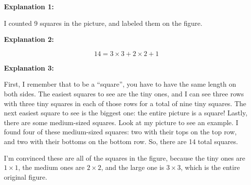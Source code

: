 \documentclass[noauthor,nooutcomes]{ximera}
\begin{document}
\parbox{2.5in}{
\begin{mdframed}

{\bf Explanation 1:}
\begin{center}
\end{center}

I counted 9 squares in the picture, and labeled them on the figure.

\end{mdframed}}
\parbox{2in}{
\begin{mdframed}
{\bf Explanation 2:}

$$ 14 = 3\times 3 + 2\times 2 + 1 $$


\end{mdframed}}

\begin{mdframed}
{\bf Explanation 3:}

First, I remember that to be a ``square'', you have to have the same length on both sides.  The easiest squares to see are the tiny ones, and I can see three rows with three tiny squares in each of those rows for a total of nine tiny squares.  The next easiest square to see is the biggest one: the entire picture is a square!  Lastly, there are some medium-sized squares.  Look at my picture to see an example.  I found four of these medium-sized squares: two with their tops on the top row, and two with their bottoms on the bottom row.  So, there are 14 total squares.


\begin{center}
\end{center}

I'm convinced these are all of the squares in the figure, because the tiny ones are $1\times 1$, the medium ones are $2 \times 2$, and the large one is $3\times 3$, which is the entire original figure.
\end{mdframed}
\end{document}
